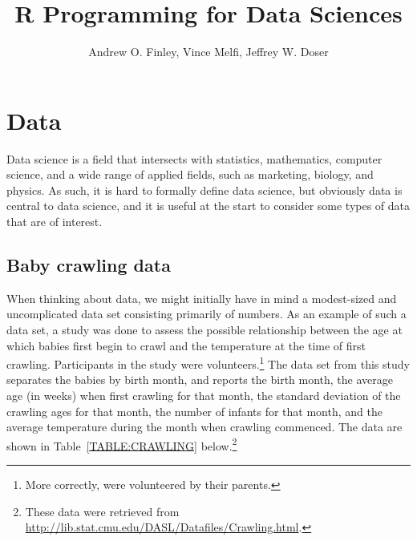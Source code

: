 \documentclass[12pt,oneside]{book}\usepackage[]{graphicx}\usepackage[]{color}
\title{R Programming for Data Sciences}
\author{Andrew O. Finley, Vince Melfi, Jeffrey W. Doser}
\begin{document}
%




\maketitle

\tableofcontents

\listoffigures

\listoftables

\listofexercise

\listofvideo


\mainmatter









\chapter{Data}
Data science is a field that intersects with statistics, mathematics, computer science, and a wide range of applied fields, such as marketing, biology, and physics. As such, it is hard to formally define data science, but obviously data is central to data science, and it is useful at the start to consider some types of data that are of interest.

\section{Baby crawling data}
When thinking about data, we might initially have in mind a modest-sized and uncomplicated data set consisting primarily of numbers. As an example of such a data set, a study was done to assess the possible relationship between the age at which babies first begin to crawl and the temperature at the time of first crawling. Participants in the study were volunteers.\footnote{More correctly, were volunteered by their parents.} The data set from this study separates the babies by birth month, and reports the birth month, the average age (in weeks) when first crawling for that month, the standard deviation of the crawling ages for that month, the number of infants for that month, and the average temperature during the month when crawling commenced. The data are shown in Table~\ref{TABLE:CRAWLING} below.\footnote{These data were retrieved from \url{http://lib.stat.cmu.edu/DASL/Datafiles/Crawling.html}.}
\end{document}
